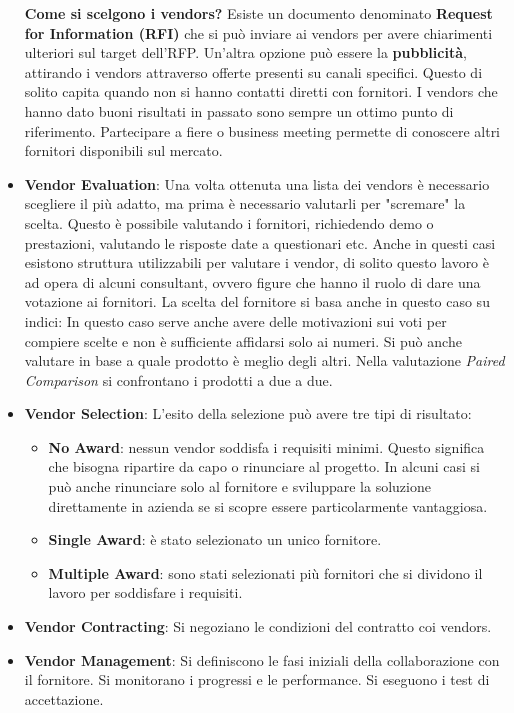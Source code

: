 \begin{itemize}
\begin{itemize}
	\end{itemize}
	\textbf{Come si scelgono i vendors?}\newline
	Esiste un documento denominato \textbf{Request for Information (RFI)} che si può inviare ai vendors per avere chiarimenti ulteriori sul target dell'RFP. Un'altra opzione può essere la \textbf{pubblicità}, attirando i vendors attraverso offerte presenti su canali specifici. Questo di solito capita quando non si hanno contatti diretti con fornitori. I vendors che hanno dato buoni risultati in passato sono sempre un ottimo punto di riferimento. Partecipare a fiere o business meeting permette di conoscere altri fornitori disponibili sul mercato.
	\item \textbf{Vendor Evaluation}: Una volta ottenuta una lista dei vendors è necessario scegliere il più adatto, ma prima è necessario valutarli per "scremare" la scelta. Questo è possibile valutando i fornitori, richiedendo demo o prestazioni, valutando le risposte date a questionari etc.\newline
	Anche in questi casi esistono struttura utilizzabili per valutare i vendor, di solito questo lavoro è ad opera di alcuni consultant, ovvero figure che hanno il ruolo di dare una votazione ai fornitori. La scelta del fornitore si basa anche in questo caso su indici:
	In questo caso serve anche avere delle motivazioni sui voti per compiere scelte e non è sufficiente affidarsi solo ai numeri.\newline
	Si può anche valutare in base a quale prodotto è meglio degli altri. Nella valutazione \textit{Paired Comparison} si confrontano i prodotti a due a due.

	\item \textbf{Vendor Selection}: L'esito della selezione può avere tre tipi di risultato:
	\begin{itemize}
		\item \textbf{No Award}: nessun vendor soddisfa i requisiti minimi. Questo significa che bisogna ripartire da capo o rinunciare al progetto. In alcuni casi si può anche rinunciare solo al fornitore e sviluppare la soluzione direttamente in azienda se si scopre essere particolarmente vantaggiosa.
		\item \textbf{Single Award}: è stato selezionato un unico fornitore.
		\item \textbf{Multiple Award}: sono stati selezionati più fornitori che si dividono il lavoro per soddisfare i requisiti.
	\end{itemize}
	\item \textbf{Vendor Contracting}: Si negoziano le condizioni del contratto coi vendors.
	\item \textbf{Vendor Management}: Si definiscono le fasi iniziali della collaborazione con il fornitore. Si monitorano i progressi e le performance. Si eseguono i test di accettazione.
\end{itemize}
